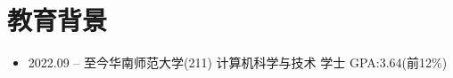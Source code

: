 \section{教育背景}
\begin{normalsize}
  \begin{itemize}[parsep=0.5ex]
    \item {2022.09 -- 至今}\hspace{1.3cm}华南师范大学(211)  \hspace{1.3cm} 计算机科学与技术 \hspace{1.3cm} 学士 \hspace{1.3cm} GPA:3.64(前12\%)
  \end{itemize}
\end{normalsize}